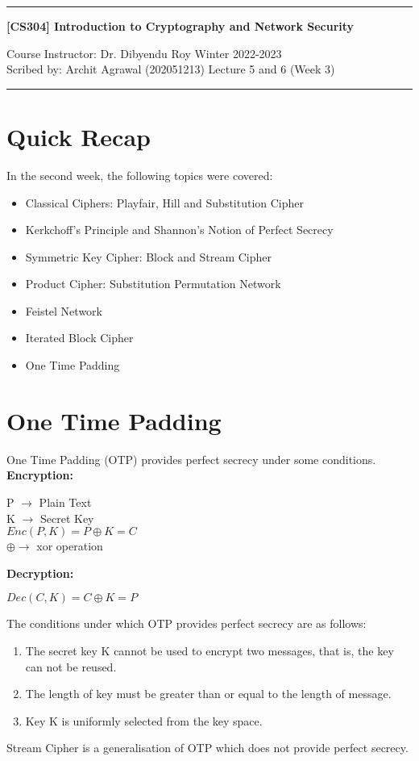 \documentclass[11pt]{article}
\begin{document}
\noindent
\rule{\textwidth}{1pt}
\begin{center}
{\bf [CS304] Introduction to Cryptography and Network Security}
\end{center}
Course Instructor: Dr. Dibyendu Roy \hfill Winter 2022-2023\\
Scribed by: Archit Agrawal (202051213) \hfill Lecture 5 and 6 (Week 3)
\\
\rule{\textwidth}{1pt}

\section{Quick Recap}
In the second week, the following topics were covered:
\begin{itemize}
    \item Classical Ciphers: Playfair, Hill and Substitution Cipher
    \item Kerkchoff's Principle and Shannon's Notion of Perfect Secrecy
    \item Symmetric Key Cipher: Block and Stream Cipher
    \item Product Cipher: Substitution Permutation Network
    \item Feistel Network
    \item Iterated Block Cipher 
    \item One Time Padding 
\end{itemize}


\section{One Time Padding}
One Time Padding (OTP) provides perfect secrecy under some conditions.\\
\newline
\textbf{Encryption: }
\begin{center}
    P $\rightarrow$ Plain Text\\
    K $\rightarrow$ Secret Key\\
    $Enc(P, K) = P \oplus K = C$\\
    $\oplus \rightarrow $ xor operation\\
\end{center}
\textbf{Decryption: }
\begin{center}
    $Dec(C, K) = C \oplus K = P$\\
\end{center}
The conditions under which OTP provides perfect secrecy are as follows:
\begin{enumerate}
    \item The secret key K cannot be used to encrypt two messages, that is, the key can not be reused.
    \item The length of key must be greater than or equal to the length of message.
    \item Key K is uniformly selected from the key space.
\end{enumerate}
Stream Cipher is a generalisation of OTP which does not provide perfect secrecy.
\end{document}
